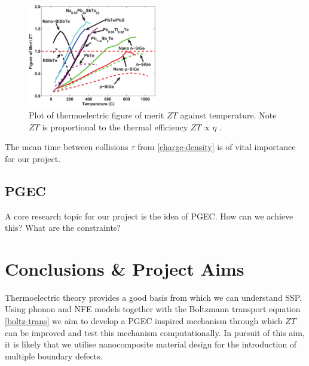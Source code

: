 \documentclass[a4paper,10pt,journal]{IEEEtran}
\begin{document}
\begin{figure}
	\centering
	\includegraphics[width=0.5\textwidth]{zt-temp-plot.png}
	\caption{Plot of thermoelectric figure of merit $ZT$ against
	temperature. Note $ZT$ is proportional to the thermal efficiency
	$ZT \propto \eta$ \cite{minnich-review}.}
\end{figure}

The mean time between collisions $\tau$ from \eqref{charge-density} is
of vital importance for our project.

\subsection{\acf{PGEC}}
A core research topic for our project is the idea of \ac{PGEC}. How can
we achieve this? What are the constraints?

\section{Conclusions \& Project Aims}
Thermoelectric theory provides a good basis from which we can
understand \ac{SSP}. Using phonon and \ac{NFE} models together with
the Boltzmann transport equation \eqref{boltz-trans} we aim to develop
a \ac{PGEC} inspired mechanism through which $ZT$ can be improved and
test this mechanism computationally. In pursuit of this aim, it is
likely that we utilise nanocomposite material design for the
introduction of multiple boundary defects.
\end{document}

